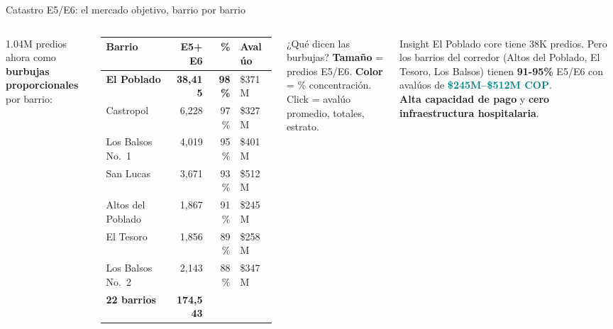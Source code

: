 \documentclass[aspectratio=169, 11pt]{beamer}
\newcommand{\highlight}[1]{\textcolor{teal}{\textbf{#1}}}
\newcommand{\src}[1]{\par\vspace{2pt}{\tiny\textcolor{slate}{Fuente: #1}}}
\begin{document}
\begin{frame}{Catastro E5/E6: el mercado objetivo, barrio por barrio}

\begin{columns}[T]
1.04M predios ahora como \textbf{burbujas proporcionales} por barrio:

\vspace{4pt}
{\scriptsize
\begin{tabular}{@{}lrrl@{}}
\toprule
\textbf{Barrio} & \textbf{E5+E6} & \textbf{\%} & \textbf{Avalúo} \\
\midrule
\rowcolor{teal!10}
\textbf{El Poblado} & \textbf{38,415} & \textbf{98\%} & \$371M \\
Castropol & 6,228 & 97\% & \$327M \\
Los Balsos No.\ 1 & 4,019 & 95\% & \$401M \\
San Lucas & 3,671 & 93\% & \$512M \\
\rowcolor{teal!6}
Altos del Poblado & 1,867 & 91\% & \$245M \\
El Tesoro & 1,856 & 89\% & \$258M \\
Los Balsos No.\ 2 & 2,143 & 88\% & \$347M \\
\midrule
\textbf{22 barrios} & \textbf{174,543} & & \\
\bottomrule
\end{tabular}
}

\src{Catastro Municipal Medellín (bp59-rj8r), 1,041,413 predios}

\vspace{4pt}
\begin{exampleblock}{\small ¿Qué dicen las burbujas?}
\footnotesize
\textbf{Tamaño} = predios E5/E6. \textbf{Color} = \% concentración.\\
Click = avalúo promedio, totales, estrato.
\end{exampleblock}

\vspace{4pt}
\begin{block}{\small Insight}
\footnotesize El Poblado core tiene 38K predios. Pero los barrios del corredor (Altos del Poblado, El Tesoro, Los Balsos) tienen \textbf{91-95\%} E5/E6 con avalúos de \highlight{\$245M--\$512M COP}.\\[3pt]
\textbf{Alta capacidad de pago} y \textbf{cero infraestructura hospitalaria}.
\end{block}
\end{columns}
\end{frame}
\end{document}
